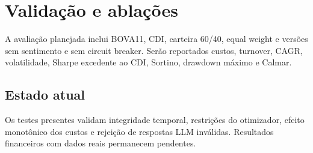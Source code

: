 \section{Validação e ablações}
A avaliação planejada inclui BOVA11, CDI, carteira 60/40, equal weight e versões
sem sentimento e sem circuit breaker. Serão reportados custos, turnover, CAGR,
volatilidade, Sharpe excedente ao CDI, Sortino, drawdown máximo e Calmar.

\subsection{Estado atual}
Os testes presentes validam integridade temporal, restrições do otimizador,
efeito monotônico dos custos e rejeição de respostas LLM inválidas. Resultados
financeiros com dados reais permanecem pendentes.

